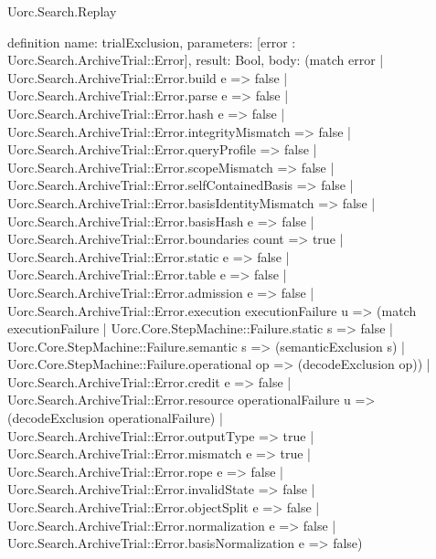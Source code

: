 \begin{lexlean}{Uorc.Search.Replay}
\begin{semanticmodule}
definition{
  name: trialExclusion,
  parameters: [error : Uorc.Search.ArchiveTrial::Error],
  result: Bool,
  body: (match error
    | Uorc.Search.ArchiveTrial::Error.build e => false
    | Uorc.Search.ArchiveTrial::Error.parse e => false
    | Uorc.Search.ArchiveTrial::Error.hash e => false
    | Uorc.Search.ArchiveTrial::Error.integrityMismatch => false
    | Uorc.Search.ArchiveTrial::Error.queryProfile => false
    | Uorc.Search.ArchiveTrial::Error.scopeMismatch => false
    | Uorc.Search.ArchiveTrial::Error.selfContainedBasis => false
    | Uorc.Search.ArchiveTrial::Error.basisIdentityMismatch => false
    | Uorc.Search.ArchiveTrial::Error.basisHash e => false
    | Uorc.Search.ArchiveTrial::Error.boundaries count => true
    | Uorc.Search.ArchiveTrial::Error.static e => false
    | Uorc.Search.ArchiveTrial::Error.table e => false
    | Uorc.Search.ArchiveTrial::Error.admission e => false
    | Uorc.Search.ArchiveTrial::Error.execution executionFailure u => (match executionFailure
      | Uorc.Core.StepMachine::Failure.static s => false
      | Uorc.Core.StepMachine::Failure.semantic s => (semanticExclusion s)
      | Uorc.Core.StepMachine::Failure.operational op => (decodeExclusion op))
    | Uorc.Search.ArchiveTrial::Error.credit e => false
    | Uorc.Search.ArchiveTrial::Error.resource operationalFailure u => (decodeExclusion operationalFailure)
    | Uorc.Search.ArchiveTrial::Error.outputType => true
    | Uorc.Search.ArchiveTrial::Error.mismatch e => true
    | Uorc.Search.ArchiveTrial::Error.rope e => false
    | Uorc.Search.ArchiveTrial::Error.invalidState => false
    | Uorc.Search.ArchiveTrial::Error.objectSplit e => false
    | Uorc.Search.ArchiveTrial::Error.normalization e => false
    | Uorc.Search.ArchiveTrial::Error.basisNormalization e => false)
}


\end{semanticmodule}
\end{lexlean}

